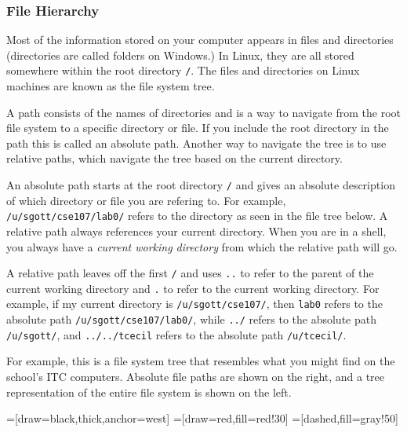 \documentclass[11pt]{cselabheader}
\begin{document}
\subsubsection{File Hierarchy}\label{file-hierarchy}

Most of the information stored on your computer appears in
files and directories (directories are
called folders on Windows.)  In Linux, they are all stored somewhere
within the root directory \texttt{/}.  The files and directories on
Linux machines are known as the file system tree.

A path consists of the names of directories and is a way to navigate
from the root file system to a specific directory or file. If you include the
root directory in the path this is called an absolute path. Another way
to navigate the tree is to use relative paths, which navigate the tree
based on the current directory.

An absolute path starts at the root directory \texttt{/} and gives an
absolute description of which directory or file you are refering to. For
example, \texttt{/u/sgott/cse107/lab0/} refers to the directory as seen
in the file tree below. A relative path always references your current
directory. When you are in a shell, you always have a
\textit{current working directory} from which the relative path will go.

A relative path leaves off the first \texttt{/} and uses \texttt{..} to
refer to the parent of the current working directory and \texttt{.} to
refer to the current working directory. For example, if my current
directory is \texttt{/u/sgott/cse107/}, then \texttt{lab0} refers to the
absolute path \texttt{/u/sgott/cse107/lab0/}, while \texttt{../} refers
to the absolute path \texttt{/u/sgott/}, and \texttt{../../tcecil}
refers to the absolute path \texttt{/u/tcecil/}.

For example, this is a file system tree that resembles what you
might find on the school's ITC computers.
Absolute file paths are shown on the right, and a tree
representation of the entire file system is shown on the left.

=[draw=black,thick,anchor=west]
=[draw=red,fill=red!30]
=[dashed,fill=gray!50]
\end{document}
